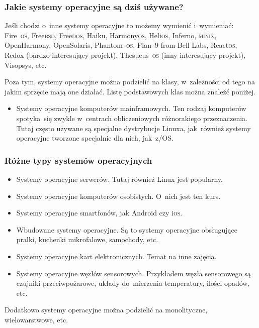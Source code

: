 \documentclass[10pt,t]{beamer}
\begin{document}
\begin{frame}
  \frametitle{Jakie systemy operacyjne są dziś używane?}


  Jeśli chodzi o~inne systemy operacyjne to możemy wymienić i~wymieniać:
  Fire~\textsc{os}, Free\textsc{bsd}, Free\textsc{dos}, Haiku,
  Harmony\textsc{os}, Heli\textsc{os}, Inferno, \textsc{minix},
  OpenHarmony, OpenSolaris, Phantom~\textsc{os}, Plan~9
  from Bell Labs, React\textsc{os}, Redox (bardzo interesujący projekt),
  Thesueus~\textsc{os} (inny interesujący projekt), Visopsys, etc.

  Poza tym, systemy operacyjne można podzielić na klasy, w~zależności od
  tego na jakim sprzęcie mają one działać. Listę podstawowych klas można
  znaleźć poniżej.

  \begin{itemize}

  \item Systemy operacyjne komputerów mainframowych. Ten rodzaj komputerów
    spotyka~się zwykle w~centrach obliczeniowych różnorakiego
    przeznaczenia. Tutaj często używane są specjalne dystrybucje Linuxa,
    jak~również systemy operacyjne tworzone specjalnie dla nich, jak~z/OS.

  \end{itemize}

\end{frame}





\begin{frame}
  \frametitle{Różne typy systemów operacyjnych}


  \begin{itemize}

  \item Systemy operacyjne serwerów. Tutaj również Linux jest popularny.

  \item Systemy operacyjne komputerów osobistych. O~nich jest ten kurs.

  \item Systemy operacyjne smartfonów, jak Android czy i\textsc{os}.

  \item Wbudowane systemy operacyjne. Są to systemy operacyjne obsługujące
    pralki, kuchenki mikrofalowe, samochody, etc.

  \item Systemy operacyjne kart elektronicznych. Temat na inne zajęcia.

  \item Systemy operacyjne węzłów sensorowych. Przykładem węzła sensorowego
    są czujniki przeciwpożarowe, układy do~mierzenia temperatury, ilości
    opadów, etc.

  \end{itemize}

  Dodatkowo systemy operacyjne można podzielić na monolityczne,
  wielowarstwowe, etc.

\end{frame}
\end{document}
